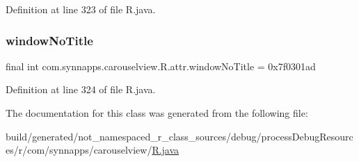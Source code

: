 Definition at line 323 of file R.\+java.

\mbox{\label{classcom_1_1synnapps_1_1carouselview_1_1_r_1_1attr_ac720f6e5c3344091e6e2da6b44180255}} 
\subsubsection{\texorpdfstring{windowNoTitle}{windowNoTitle}}
{\footnotesize\ttfamily final int com.\+synnapps.\+carouselview.\+R.\+attr.\+window\+No\+Title = 0x7f0301ad\hspace{0.3cm}{\ttfamily [static]}}



Definition at line 324 of file R.\+java.



The documentation for this class was generated from the following file\+:\begin{DoxyCompactItemize}
\item 
build/generated/not\+\_\+namespaced\+\_\+r\+\_\+class\+\_\+sources/debug/process\+Debug\+Resources/r/com/synnapps/carouselview/\mbox{\hyperlink{com_2synnapps_2carouselview_2_r_8java}{R.\+java}}\end{DoxyCompactItemize}

